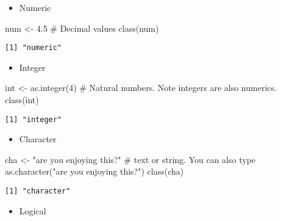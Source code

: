 \documentclass[
  letterpaper,
  krantz2]{style/krantz}
\newenvironment{Shaded}{\begin{snugshade}}{\end{snugshade}}
\newcommand{\CommentTok}[1]{\textcolor[rgb]{0.37,0.37,0.37}{#1}}
\newcommand{\DecValTok}[1]{\textcolor[rgb]{0.68,0.00,0.00}{#1}}
\newcommand{\FloatTok}[1]{\textcolor[rgb]{0.68,0.00,0.00}{#1}}
\newcommand{\FunctionTok}[1]{\textcolor[rgb]{0.28,0.35,0.67}{#1}}
\newcommand{\NormalTok}[1]{\textcolor[rgb]{0.00,0.23,0.31}{#1}}
\newcommand{\OtherTok}[1]{\textcolor[rgb]{0.00,0.23,0.31}{#1}}
\newcommand{\StringTok}[1]{\textcolor[rgb]{0.13,0.47,0.30}{#1}}
\providecommand{\tightlist}{%
  \setlength{\itemsep}{0pt}\setlength{\parskip}{0pt}}\usepackage{longtable,booktabs,array}
\begin{document}
\begin{itemize}
\tightlist
\item
  Numeric
\end{itemize}

\begin{Shaded}
\begin{Highlighting}[]
\NormalTok{num }\OtherTok{\textless{}{-}} \FloatTok{4.5} \CommentTok{\# Decimal values}
\FunctionTok{class}\NormalTok{(num)}
\end{Highlighting}
\end{Shaded}

\begin{verbatim}
[1] "numeric"
\end{verbatim}

\begin{itemize}
\tightlist
\item
  Integer
\end{itemize}

\begin{Shaded}
\begin{Highlighting}[]
\NormalTok{int }\OtherTok{\textless{}{-}} \FunctionTok{as.integer}\NormalTok{(}\DecValTok{4}\NormalTok{) }\CommentTok{\# Natural numbers. Note integers are also numerics.}
\FunctionTok{class}\NormalTok{(int)}
\end{Highlighting}
\end{Shaded}

\begin{verbatim}
[1] "integer"
\end{verbatim}

\begin{itemize}
\tightlist
\item
  Character
\end{itemize}

\begin{Shaded}
\begin{Highlighting}[]
\NormalTok{cha }\OtherTok{\textless{}{-}} \StringTok{"are you enjoying this?"} \CommentTok{\# text or string. You can also type \textasciigrave{}as.character("are you enjoying this?")\textasciigrave{}}
\FunctionTok{class}\NormalTok{(cha)}
\end{Highlighting}
\end{Shaded}

\begin{verbatim}
[1] "character"
\end{verbatim}

\begin{itemize}
\tightlist
\item
  Logical
\end{itemize}
\end{document}
